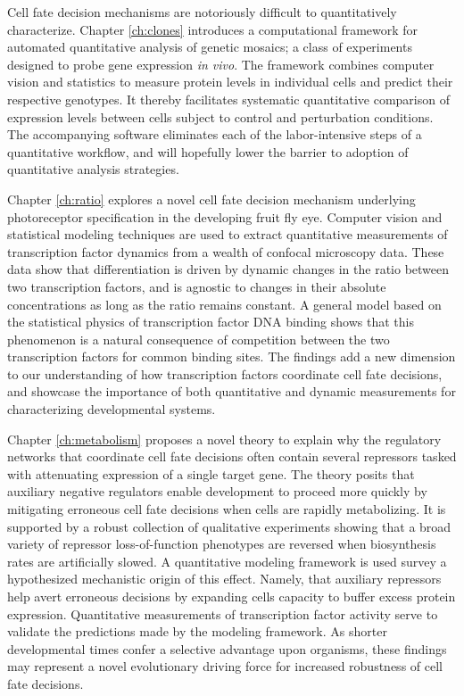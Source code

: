 



Cell fate decision mechanisms are notoriously difficult to quantitatively characterize. Chapter \ref{ch:clones} introduces a computational framework for automated quantitative analysis of genetic mosaics; a class of experiments designed to probe gene expression \textit{in vivo}. The framework combines computer vision and statistics to measure protein levels in individual cells and predict their respective genotypes. It thereby facilitates systematic quantitative comparison of expression levels between cells subject to control and perturbation conditions. The accompanying software eliminates each of the labor-intensive steps of a quantitative workflow, and will hopefully lower the barrier to adoption of quantitative analysis strategies. 

Chapter \ref{ch:ratio} explores a novel cell fate decision mechanism underlying photoreceptor specification in the developing fruit fly eye. Computer vision and statistical modeling techniques are used to extract quantitative measurements of transcription factor dynamics from a wealth of confocal microscopy data. These data show that differentiation is driven by dynamic changes in the ratio between two transcription factors, and is agnostic to changes in their absolute concentrations as long as the ratio remains constant. A general model based on the statistical physics of transcription factor DNA binding shows that this phenomenon is a natural consequence of competition between the two transcription factors for common binding sites. The findings add a new dimension to our understanding of how transcription factors coordinate cell fate decisions, and showcase the importance of both quantitative and dynamic measurements for characterizing developmental systems. 

Chapter \ref{ch:metabolism} proposes a novel theory to explain why the regulatory networks that coordinate cell fate decisions often contain several repressors tasked with attenuating expression of a single target gene. The theory posits that auxiliary negative regulators enable development to proceed more quickly by mitigating erroneous cell fate decisions when cells are rapidly metabolizing. It is supported by a robust collection of qualitative experiments showing that a broad variety of repressor loss-of-function phenotypes are reversed when biosynthesis rates are artificially slowed. A quantitative modeling framework is used survey a hypothesized mechanistic origin of this effect. Namely, that auxiliary repressors help avert erroneous decisions by expanding cells capacity to buffer excess protein expression. Quantitative measurements of transcription factor activity serve to validate the predictions made by the modeling framework. As shorter developmental times confer a selective advantage upon organisms, these findings may represent a novel evolutionary driving force for increased robustness of cell fate decisions.


